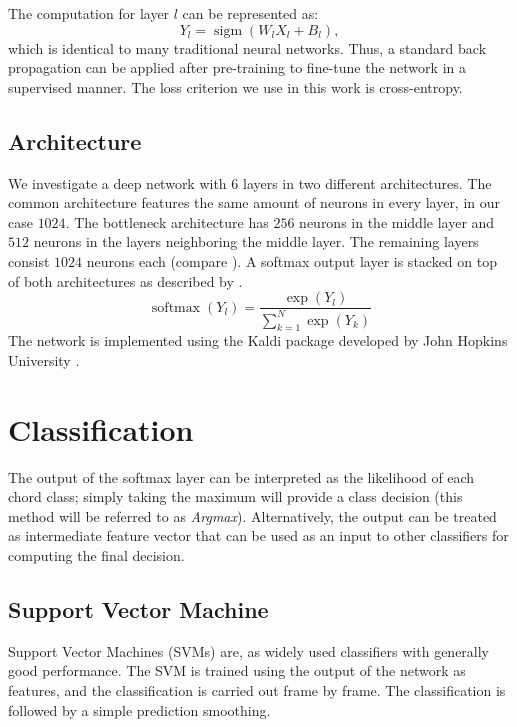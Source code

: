 \documentclass{article}
\DeclareMathOperator*{\sigm}{sigm}
\DeclareMathOperator*{\softmax}{softmax}
\begin{document}
The computation for layer $l$ can be represented as:
\begin{equation}\label{dbn}
Y_{l} = \sigm(W_{l}X_{l} + B_{l}) ,
\end{equation}  
which is identical to many traditional neural networks. Thus, a standard back propagation can be applied after pre-training to fine-tune the network in a supervised manner. The loss criterion we use in this work is cross-entropy.  

\subsection{Architecture}\label{sec:arch}
We investigate a deep network with $6$ layers in two different architectures. The common architecture features the same amount of neurons in every layer, in our case $1024$. The bottleneck architecture has $256$ neurons in the middle layer and $512$ neurons in the layers neighboring the middle layer. The remaining layers consist $1024$ neurons each (compare \cite{grezl2007probabilistic}).
A softmax output layer is stacked on top of both architectures as described by .
\begin{equation}\label{softmax}
\softmax(Y_{l}) = \frac{\exp(Y_{l})}{\sum_{k=1}^N \exp(Y_{k})}
\end{equation}
The network is implemented using the Kaldi package developed by John Hopkins University \cite{povey2011kaldi}.
 
\section{Classification}\label{sec:class}
The output of the softmax layer can be interpreted as the likelihood of each chord class; simply taking the maximum will provide a class decision (this method will be referred to as \textit{Argmax}). Alternatively, the output can be treated as intermediate feature vector that can be used as an input to other classifiers for computing the final decision. 
\subsection{Support Vector Machine}
Support Vector Machines (SVMs) are, as widely used classifiers with generally good performance. The SVM is trained using the output of the network as features, and the classification is carried out frame by frame. The classification is followed by a simple prediction smoothing.
\end{document}

